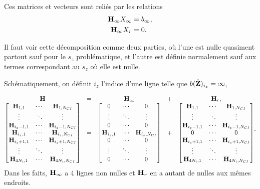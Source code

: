 Ces matrices et vecteurs sont reliés par les relations
\begin{align}
  {\mathbf{H}}_\infty X_\infty &= {b}_\infty,
  \\
  {\mathbf{H}}_\infty X_r &= 0.
\end{align}

Il faut voir cette décomposition comme deux parties, où l'une est nulle quasiment partout sauf pour le \(s_z\) problématique, et l'autre est définie normalement sauf aux termes correspondant au \(s_z\) où elle est nulle.

Schématiquement, on définit \(i_z\) l'indice d'une ligne telle que \({b}(\hat{\mathbf{Z}})_{i_z} = \infty\), 

\begin{equation*}
  \begin{matrix}
    {\mathbf{H}} &=& {\mathbf{H}}_\infty &+& {\mathbf{H}}_r,
    \\
    \begin{bmatrix}
      {\mathbf{H}}_{1,1} & \cdots & {\mathbf{H}}_{1,N_{CI}}
      \\
      \vdots & \ddots & \vdots
      \\
      {\mathbf{H}}_{i_z-1,1} & \cdots & {\mathbf{H}}_{i_z-1,N_{CI}}
      \\
      {\mathbf{H}}_{i_z,1} & \cdots & {\mathbf{H}}_{i_z,N_{CI}}
      \\
      {\mathbf{H}}_{i_z+1,1} & \cdots & {\mathbf{H}}_{i_z+1,N_{CI}}
      \\
      \vdots & \ddots & \vdots
      \\
      {\mathbf{H}}_{4N_i,1} & \cdots & {\mathbf{H}}_{4N_i,N_{CI}}
    \end{bmatrix}
    & = &
    \begin{bmatrix}
      0 & \cdots & 0
      \\
      \vdots & \ddots & \vdots
      \\
      0 & \cdots & 0
      \\
      {\mathbf{H}}_{i_z,1} & \cdots & {\mathbf{H}}_{i_z,N_{CI}}
      \\
      0 & \cdots & 0
      \\
      \vdots & \ddots & \vdots
      \\
      0 & \cdots & 0
    \end{bmatrix}
    & + & 
    \begin{bmatrix}
      {\mathbf{H}}_{1,1} & \cdots & {\mathbf{H}}_{1,N_{CI}}
      \\
      \vdots & \ddots & \vdots
      \\
      {\mathbf{H}}_{i_z-1,1} & \cdots & {\mathbf{H}}_{i_z-1,N_{CI}}
      \\
      0 & \cdots & 0
      \\
      {\mathbf{H}}_{i_z+1,1} & \cdots & {\mathbf{H}}_{i_z+1,N_{CI}}
      \\
      \vdots & \ddots & \vdots
      \\
      {\mathbf{H}}_{4N_i,1} & \cdots & {\mathbf{H}}_{4N_i,N_{CI}}
    \end{bmatrix}
  \end{matrix}.
\end{equation*}
Dans les faits, \({\mathbf{H}}_\infty\) a \(4\) lignes non nulles et \({\mathbf{H}}_r\) en a autant de nulles aux mêmes endroits.


